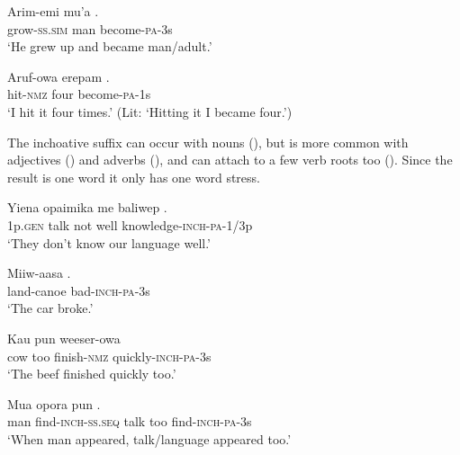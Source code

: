 \ea%
\label{ex:x191}
\gll Arim-emi mu'a . \\
grow-\textsc{ss}.\textsc{sim} man become-\textsc{pa}-3s \\
\glt`He grew up and became man/adult.'
\z

\ea%
\label{ex:x192}
\gll Aruf-owa erepam . \\
hit-\textsc{nmz} four become-\textsc{pa}-1s \\
\glt`I hit it four times.' (Lit: `Hitting it I became four.')
\z

The inchoative suffix \textstyleEmphasizedVernacularWords{\nobreakdash-} can occur with nouns (), but is more common with adjectives () and adverbs (), and can attach to a few verb roots too (). Since the result is one word it only has one word stress. 

\ea%
\label{ex:x193}
\gll Yiena opaimika me baliwep . \\
1p.\textsc{gen} talk not well knowledge-\textsc{inch}-\textsc{pa}-1/3p \\
\glt`They don't know our language well.'
\z

\ea%
\label{ex:x194}
\gll Miiw-aasa .{\footnotemark} \\
land-canoe bad-\textsc{inch}-\textsc{pa}-3s \\
\glt`The car broke.'
\z


\ea%
\label{ex:x195}
\gll Kau pun weeser-owa  \\
cow too finish-\textsc{nmz} quickly-\textsc{inch}-\textsc{pa}-3s \\
\glt`The beef finished quickly too.'
\z

\ea%
\label{ex:x196}
\gll Mua  opora pun . \\
man find-\textsc{inch}-\textsc{ss}.\textsc{seq} talk too find-\textsc{inch}-\textsc{pa}-3s\\
\glt`When man appeared, talk/language appeared too.'
\z

